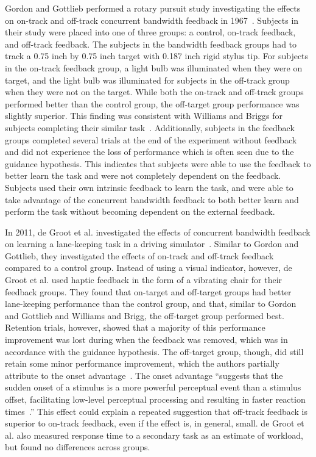 \documentclass[float=false, crop=false]{standalone}
\begin{document}
Gordon and Gottlieb performed a rotary pursuit study investigating the effects on on-track and off-track concurrent bandwidth feedback in 1967~\cite{Gordon1967}.
Subjects in their study were placed into one of three groups: a control, on-track feedback, and off-track feedback.
The subjects in the bandwidth feedback groups had to track a 0.75 inch by 0.75 inch target with 0.187 inch rigid stylus tip.
For subjects in the on-track feedback group, a light bulb was illuminated when they were on target, and the light bulb was illuminated for subjects in the off-track group when they were not on the target.
While both the on-track and off-track groups performed better than the control group, the off-target group performance was slightly superior.
This finding was consistent with Williams and Briggs for subjects completing their similar task~\cite{williams1962target}.
Additionally, subjects in the feedback groups completed several trials at the end of the experiment without feedback and did not experience the loss of performance which is often seen due to the guidance hypothesis.
This indicates that subjects were able to use the feedback to better learn the task and were not completely dependent on the feedback.
Subjects used their own intrinsic feedback to learn the task, and were able to take advantage of the concurrent bandwidth feedback to both better learn and perform the task without becoming dependent on the external feedback.

In 2011, de Groot et al. investigated the effects of concurrent bandwidth feedback on learning a lane-keeping task in a driving simulator~\cite{DeGroot2011}.
Similar to Gordon and Gottlieb, they investigated the effects of on-track and off-track feedback compared to a control group.
Instead of using a visual indicator, however, de Groot et al. used haptic feedback in the form of a vibrating chair for their feedback groups.
They found that on-target and off-target groups had better lane-keeping performance than the control group, and that, similar to Gordon and Gottlieb and Williams and Brigg, the off-target group performed best.
Retention trials, however, showed that a majority of this performance improvement was lost during when the feedback was removed, which was in accordance with the guidance hypothesis.
The off-target group, though, did still retain some minor performance improvement, which the authors partially attribute to the onset advantage~\cite{fischer2008differential}.
The onset advantage ``suggests that the sudden onset of a stimulus is a more powerful perceptual event than a stimulus offset, facilitating low-level perceptual processing and resulting in faster reaction times~\cite{DeGroot2011}.''
This effect could explain a repeated suggestion that off-track feedback is superior to on-track feedback, even if the effect is, in general, small.
de Groot et al. also measured response time to a secondary task as an estimate of workload, but found no differences across groups.
\end{document}
